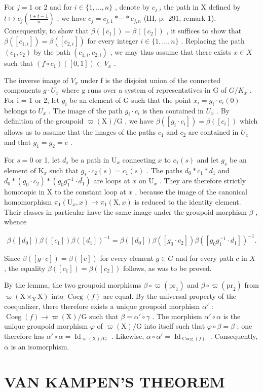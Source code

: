For \(j = 1\) or 2 and for \(i \in \{1, \ldots, n\}\) , denote by \(c_{j,i}\) the path in X defined by \(t \mapsto c_j(\frac{i+t-1}{n})\) ; we have \(c_j = c_{j,1} * \cdots * c_{j,n}\) (III, p.~291, remark 1). Consequently, to show that \(\beta([c_1]) = \beta([c_2])\) , it suffices to show that \(\beta([c_{1,i}]) = \beta([c_{2,i}])\) for every integer \(i \in \{1, \ldots, n\}\) . Replacing the path \((c_1, c_2)\) by the path \((c_{1,i}, c_{2,i})\) , we may thus assume that there exists \(x \in X\) such that \((f \circ c_1)([0,1]) \subset V_x\) .

The inverse image of \(V_{x}\) under f is the disjoint union of the connected components \(g \cdot U_{x}\) where g runs over a system of representatives in G of \(G/K_{x}\) . For i = 1 or 2, let \(g_{i}\) be an element of G such that the point \(x_{i} = g_{i} \cdot c_{i}(0)\) belongs to \(U_{x}\) . The image of the path \(g_{i} \cdot c_{i}\) is then contained in \(U_{x}\) . By definition of the groupoid \(\varpi(\mathrm{X})/\mathrm{G}\) , we have \(\beta([g_{i} \cdot c_{i}]) = \beta([c_{i}])\) which allows us to assume that the images of the paths \(c_{1}\) and \(c_{2}\) are contained in \(U_{x}\) and that \(g_{1} = g_{2} = e\) .

For \(s=0\) or 1, let \(d_{s}\) be a path in \(\mathrm{U}_{x}\) connecting \(x\) to \(c_{1}(s)\) and let \(g_{s}\) be an element of \(\mathrm{K}_{x}\) such that \(g_{s}\cdot c_{2}(s)=c_{1}(s)\) . The paths \(d_{0}*c_{1}*\overline{d_{1}}\) and \(d_{0}*(g_{0}\cdot c_{2})*(g_{0}g_{1}^{-1}\cdot\overline{d_{1}})\) are loops at \(x\) on \(\mathrm{U}_{x}\) . They are therefore strictly homotopic in X to the constant loop at \(x\) , because the image of the canonical homomorphism \(\pi_{1}(\mathrm{U}_{x},x)\to\pi_{1}(\mathrm{X},x)\) is reduced to the identity element. Their classes in particular have the same image under the groupoid morphism \(\beta\) , whence

\[
\beta ([ d _ {0} ]) \beta ([ c _ {1} ]) \beta ([ d _ {1} ]) ^ {- 1} = \beta ([ d _ {0} ]) \beta ([ g _ {0} \cdot c _ {2} ]) \beta ([ g _ {0} g _ {1} ^ {- 1} \cdot d _ {1} ]) ^ {- 1}.
\]

Since \(\beta([g \cdot c]) = \beta([c])\) for every element \(g \in G\) and for every path \(c\) in \(X\) , the equality \(\beta([c_1]) = \beta([c_2])\) follows, as was to be proved.

By the lemma, the two groupoid morphisms \(\beta \circ \varpi(\mathrm{pr}_{1})\) and \(\beta \circ \varpi(\mathrm{pr}_{2})\) from \(\varpi(\mathrm{X} \times_{\mathrm{Y}} \mathrm{X})\) into \(\operatorname{Coeg}(f)\) are equal. By the universal property of the coequalizer, there therefore exists a unique groupoid morphism \(\alpha'\) : \(\operatorname{Coeg}(f) \to \varpi(\mathrm{X})/\mathrm{G}\) such that \(\beta = \alpha' \circ \gamma\) . The morphism \(\alpha' \circ \alpha\) is the unique groupoid morphism \(\varphi\) of \(\varpi(\mathrm{X})/\mathrm{G}\) into itself such that \(\varphi \circ \beta = \beta\) ; one therefore has \(\alpha' \circ \alpha = \operatorname{Id}_{\varpi(\mathrm{X})/\mathrm{G}}\) . Likewise, \(\alpha \circ \alpha' = \operatorname{Id}_{\operatorname{Coeg}(f)}\) . Consequently, \(\alpha\) is an isomorphism.

\section{VAN KAMPEN'S THEOREM}
